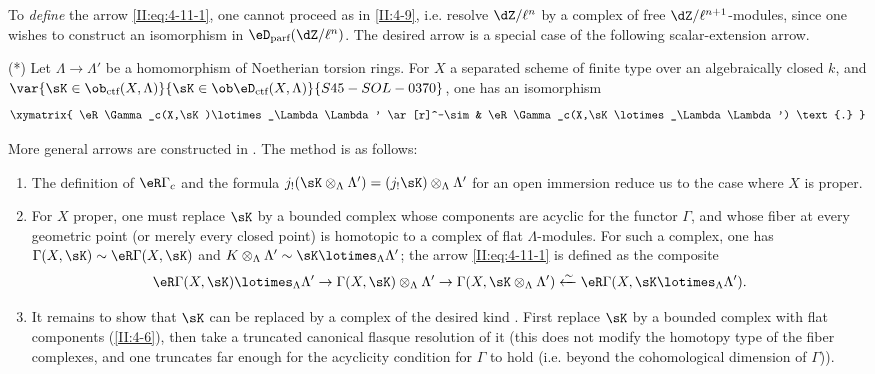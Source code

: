 To \emph{define} the arrow \eqref{II:eq:4-11-1}, one cannot proceed as in
\ref{II:4-9}, i.e. resolve $\dZ/\ell^n$ by a complex of free
$\dZ/\ell^{n+1}$-modules, since one wishes to construct an isomorphism in
$\eD_\text{parf}(\dZ/\ell^n)$. The desired arrow is a special case of the
following scalar-extension arrow.

(*) Let $\Lambda\to\Lambda'$ be a homomorphism of Noetherian torsion rings.
For $X$ a separated scheme of finite type over an algebraically closed $k$,
and $\var{\sK\in\ob_{\text{ctf}}(X,\Lambda)}{\sK\in\ob\eD_\text{ctf}(X,\Lambda)}{S45-SOL-0370}$, one has an isomorphism
\[\xymatrix{
  \eR\Gamma_c(X,\sK)\lotimes_\Lambda \Lambda' \ar[r]^-\sim & \eR \Gamma_c(X,\sK\lotimes_\Lambda \Lambda') \text{.}
}\]

More general arrows are constructed in \cite[XVII 4.2.12]{sga4}. The method
is as follows:
\begin{enumerate}[\indent a)]
  \item {}The definition of $\eR\Gamma_c$ and the formula
    $j_!(\sK\otimes_\Lambda\Lambda') = (j_! \sK)\otimes_\Lambda\Lambda'$ for
    an open immersion reduce us to the case where $X$ is proper.
  \item For $X$ proper, one must replace $\sK$ by a bounded complex whose
    components are acyclic for the functor $\Gamma$, and whose fiber at every
    geometric point (or merely every closed point) is homotopic to a complex
    of flat $\Lambda$-modules. For such a complex, one has
    $\Gamma(X,\sK)\sim \eR\Gamma(X,\sK)$ and
    $K\otimes_\Lambda\Lambda'\sim \sK\lotimes_\Lambda\Lambda'$; the arrow
    \eqref{II:eq:4-11-1} is defined as the composite
    \[
      \eR\Gamma(X,\sK)\lotimes_\Lambda \Lambda' \to \Gamma(X,\sK)\otimes_\Lambda\Lambda' \to \Gamma(X,\sK\otimes_\Lambda\Lambda') \xleftarrow\sim \eR\Gamma(X,\sK\lotimes_\Lambda\Lambda') \text{.}
    \]
  \item It remains to show that $\sK$ can be replaced by a complex of the
    desired kind \cite[XVII.4.2.10]{sga4}. First replace $\sK$ by a bounded
    complex with flat components (\ref{II:4-6}), then take a truncated
    canonical flasque resolution of it (this does not modify the homotopy
    type of the fiber complexes, and one truncates far enough for the
    acyclicity condition for $\Gamma$ to hold (i.e. beyond the cohomological
    dimension of $\Gamma$)).
\end{enumerate}






